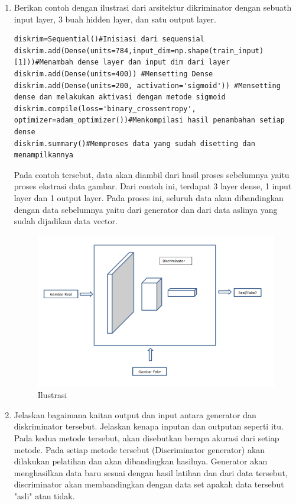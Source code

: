 \begin{enumerate}
\item Berikan contoh dengan ilustrasi dari arsitektur dikriminator dengan sebuath input layer, 3 buah hidden layer, dan satu output layer.
\begin{verbatim}
diskrim=Sequential()#Inisiasi dari sequensial
diskrim.add(Dense(units=784,input_dim=np.shape(train_input)[1]))#Menambah dense layer dan input dim dari layer
diskrim.add(Dense(units=400)) #Mensetting Dense
diskrim.add(Dense(units=200, activation='sigmoid')) #Mensetting dense dan melakukan aktivasi dengan metode sigmoid
diskrim.compile(loss='binary_crossentropy', optimizer=adam_optimizer())#Menkompilasi hasil penambahan setiap dense
diskrim.summary()#Memproses data yang sudah disetting dan menampilkannya
\end{verbatim}
\par Pada contoh tersebut, data akan diambil dari hasil proses sebelumnya yaitu proses ekstrasi data gambar. Dari contoh ini, terdapat 3 layer dense, 1 input layer dan 1 output layer. Pada proses ini, seluruh data akan dibandingkan dengan data sebelumnya yaitu dari generator dan dari data aslinya yang sudah dijadikan data vector. 
\begin{figure}[ht]
\centering
\includegraphics[scale=0.3]{figures/1174002/chapter8/10.PNG}
\caption{Ilustrasi}
\label{Contoh}
\end{figure}

\item Jelaskan bagaimana kaitan output dan input antara generator dan diskriminator tersebut. Jelaskan kenapa inputan dan outputan seperti itu.
Pada kedua metode tersebut, akan disebutkan berapa akurasi dari setiap metode. Pada setiap metode tersebut (Discriminator generator) akan dilakukan pelatihan dan akan dibandingkan hasilnya. Generator akan menghasilkan data baru sesuai dengan hasil latihan dan dari data tersebut, discriminator akan membandingkan dengan data set apakah data tersebut "asli" atau tidak.


\end{enumerate}
